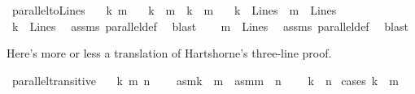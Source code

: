 \begin{isabellebody}
\begin{isamarkuptext}
\done%
\end{isamarkuptext}\isamarkuptrue%
\isamarkupfalse%
\ parallel{\isacharunderscore}{\kern0pt}to{\isacharunderscore}{\kern0pt}Lines{\isacharcolon}{\kern0pt}\isanewline
\ \ \ k\ m\isanewline
\ \ \ {\isachardoublequoteopen}k\ {\isacharbar}{\kern0pt}{\isacharbar}{\kern0pt}\ m{\isachardoublequoteclose}\ \ {\isachardoublequoteopen}k\ {\isasymnoteq}\ m{\isachardoublequoteclose}\isanewline
\ \ \ {\isachardoublequoteopen}k\ {\isasymin}\ Lines{\isachardoublequoteclose}\ \ {\isachardoublequoteopen}m\ {\isasymin}\ Lines{\isachardoublequoteclose}\isanewline
%
\isadelimproof
%
\endisadelimproof
%
\isatagproof
{}\isamarkupfalse%
\ {\isacharminus}{\kern0pt}\isanewline
\ \ \isamarkupfalse%
\ {\isachardoublequoteopen}k\ {\isasymin}\ Lines{\isachardoublequoteclose}\ \isamarkupfalse%
\ assms\ parallel{\isacharunderscore}{\kern0pt}def\ \isamarkupfalse%
\ blast\isanewline
{}\isamarkupfalse%
\isanewline
\ \ \isamarkupfalse%
\ {\isachardoublequoteopen}m\ {\isasymin}\ Lines{\isachardoublequoteclose}\ \isamarkupfalse%
\ assms\ parallel{\isacharunderscore}{\kern0pt}def\ \isamarkupfalse%
\ blast\isanewline
{}\isamarkupfalse%
%
\endisatagproof
{\isafoldproof}%
%
\isadelimproof
%
\endisadelimproof
%
\begin{isamarkuptext}%
Here's more or less a translation of Hartshorne's three-line proof.%
\end{isamarkuptext}\isamarkuptrue%
\isamarkupfalse%
\ parallel{\isacharunderscore}{\kern0pt}transitive{}{\isacharcolon}{\kern0pt}\isanewline
\ \ \ k\ m\ n\ \isanewline
\ \ \ asm{}{\isacharcolon}{\kern0pt}{\isachardoublequoteopen}k\ {\isacharbar}{\kern0pt}{\isacharbar}{\kern0pt}\ m{\isachardoublequoteclose}\ \ asm{}{\isacharcolon}{\kern0pt}{\isachardoublequoteopen}m\ {\isacharbar}{\kern0pt}{\isacharbar}{\kern0pt}\ n{\isachardoublequoteclose}\ \isanewline
\ \ \ {\isachardoublequoteopen}k\ {\isacharbar}{\kern0pt}{\isacharbar}{\kern0pt}\ n{\isachardoublequoteclose}\isanewline
%
\isadelimproof
%
\endisadelimproof
%
\isatagproof
{}\isamarkupfalse%
\ {\isacharparenleft}{\kern0pt}cases\ {\isachardoublequoteopen}k\ {\isacharequal}{\kern0pt}\ m{\isachardoublequoteclose}{\isacharparenright}{\kern0pt}\isanewline

\end{isabellebody}
